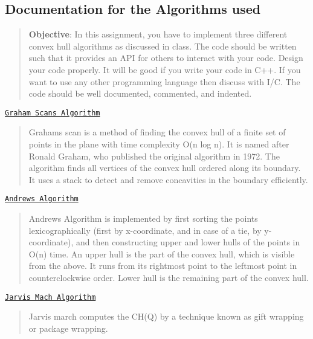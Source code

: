 \subsection*{Documentation for the Algorithms used }

\begin{quote}
{\bfseries Objective}\+: In this assignment, you have to implement three different convex hull algorithms as discussed in class. The code should be written such that it provides an A\+PI for others to interact with your code. Design your code properly. It will be good if you write your code in C++. If you want to use any other programming language then discuss with I/C. The code should be well documented, commented, and indented. \end{quote}



\begin{DoxyEnumerate}
\item \href{https://en.wikipedia.org/wiki/Graham_scan}{\tt Graham Scans Algorithm} \begin{quote}
Graham\textquotesingle{}s scan is a method of finding the convex hull of a finite set of points in the plane with time complexity O(n log n). It is named after Ronald Graham, who published the original algorithm in 1972. The algorithm finds all vertices of the convex hull ordered along its boundary. It uses a stack to detect and remove concavities in the boundary efficiently. \end{quote}

\item \href{http://nms.csail.mit.edu/~aklmiu/6.838/convexhull/}{\tt Andrews Algorithm} \begin{quote}
Andrew\textquotesingle{}s Algorithm is implemented by first sorting the points lexicographically (first by x-\/coordinate, and in case of a tie, by y-\/coordinate), and then constructing upper and lower hulls of the points in O(n) time. An upper hull is the part of the convex hull, which is visible from the above. It runs from its rightmost point to the leftmost point in counterclockwise order. Lower hull is the remaining part of the convex hull. \end{quote}

\item \href{http://www.personal.kent.edu/~rmuhamma/Compgeometry/MyCG/ConvexHull/jarvisMarch.htm}{\tt Jarvis Mach Algorithm} \begin{quote}
Jarvis march computes the C\+H(\+Q) by a technique known as gift wrapping or package wrapping. \end{quote}

\end{DoxyEnumerate}











